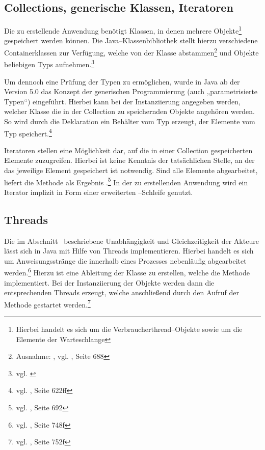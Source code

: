 \subsection{Collections, generische Klassen, Iteratoren} %
\label{sub:generics}
Die zu erstellende Anwendung benötigt Klassen, in denen mehrere Objekte\footnote{Hierbei handelt es sich um die Verbraucherthread–Objekte sowie um die Elemente der Warteschlange} gespeichert werden können. Die Java–Klassenbibliothek stellt hierzu verschiedene Containerklassen zur Verfügung, welche von der Klasse  abstammen\footnote{Ausnahme: , vgl. \cite{javaorange}, Seite 688} und Objekte beliebigen Typs aufnehmen.\footnote{vgl. \cite{javadoc:collection}}

Um dennoch eine Prüfung der Typen zu ermöglichen, wurde in Java ab der Version 5.0 das Konzept der generischen Programmierung (auch „parametrisierte Typen“) eingeführt. Hierbei kann bei der Instanziierung angegeben werden, welcher Klasse die in der Collection zu speichernden Objekte angehören werden. So wird durch die Deklaration  ein Behälter vom Typ  erzeugt, der Elemente vom Typ  speichert.\footnote{vgl. \cite{javaorange}, Seite 622ff}

Iteratoren stellen eine Möglichkeit dar, auf die in einer Collection gespeicherten Elemente zuzugreifen. Hierbei ist keine Kenntnis der tatsächlichen Stelle, an der das jeweilige Element gespeichert ist notwendig. Sind alle Elemente abgearbeitet, liefert die Methode  als Ergebnis .\footnote{vgl. \cite{javaorange}, Seite 692} In der zu erstellenden Anwendung wird ein Iterator implizit in Form einer erweiterten –Schleife genutzt.

\subsection{Threads} %
\label{sub:die_klasse_thread}
Die im Abschnitt~ beschriebene Unabhängigkeit und Gleichzeitigkeit der Akteure lässt sich in Java mit Hilfe von Threads implementieren. Hierbei handelt es sich um Anweisungsstränge die innerhalb eines Prozesses nebenläufig abgearbeitet werden.\footnote{vgl. \cite{javaorange}, Seite 748f}
Hierzu ist eine Ableitung der Klasse  zu erstellen, welche die Methode  implementiert. Bei der Instanziierung der Objekte werden dann die entsprechenden Threads erzeugt, welche anschließend durch den Aufruf der Methode  gestartet werden.\footnote{vgl. \cite{javaorange}, Seite 752f}

